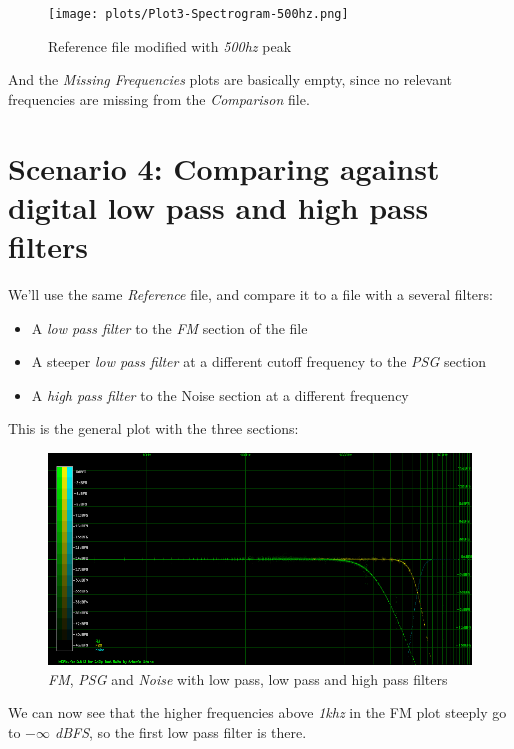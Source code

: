 \documentclass[10pt,a4paper]{report}
\begin{document}
\begin{figure}[H]
	\centering
	\texttt{[image: plots/Plot3-Spectrogram-500hz.png]}
	\caption[Reference File]{Reference file modified with \textit{500hz} peak}
	\label{fig:plot3-spectrogram-1khz}
\end{figure}


And the \textit{Missing Frequencies} plots are basically empty, since no relevant frequencies are missing from the \textit{Comparison} file.

\section{Scenario 4: Comparing against digital low pass and high pass filters}

We'll use the same \textit{Reference} file, and compare it to a file with a several filters:

\begin{itemize}
	\item A \textit{low pass filter} to the \textit{FM} section of the file
	\item A steeper \textit{low pass filter} at a different cutoff frequency to the \textit{PSG} section
	\item A \textit{high pass filter} to the Noise section at a different frequency
\end{itemize}

This is the general plot with the three sections:

\begin{figure}[H]
	\centering
	\includegraphics[width=1.0\linewidth]{plots/Plot4-1-All.png}
	\caption[All Plotted]{\textit{FM}, \textit{PSG} and \textit{Noise} with low pass, low pass and high pass filters}
	\label{fig:plot4-1-all}
\end{figure}

We can now see that the higher frequencies above \textit{1khz} in the FM plot steeply go to \textit{$-\infty$ dBFS}, so the first low pass filter is there.
\end{document}

